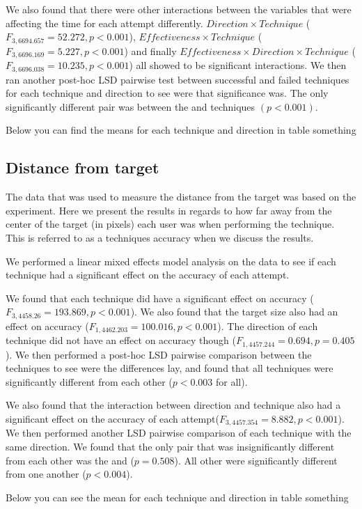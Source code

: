 We also found that there were other interactions between the variables that were affecting the time for each attempt differently. 
$Direction \times Technique$  ($F_{3,6694.657} = 52.272, p < 0.001$), $Effectiveness \times Technique$  ($F_{3,6696.169} = 5.227, p < 0.001$) and finally $Effectiveness \times Direction \times Technique$  ($F_{3,6696.038} = 10.235, p < 0.001$) all showed to be significant interactions. 
We then ran another post-hoc LSD pairwise test between successful and failed techniques for each technique and direction to see were that significance was. 
The only significantly different pair was between the \grab \push and \grab \pull techniques $(p < 0.001)$.

Below you can find the means for each technique and direction in table something

\subsection{Distance from target}
The data that was used to measure the distance from the target was based on the \accuracy experiment.
Here we present the results in regards to how far away from the center of the target (in pixels) each user was when performing the technique. 
This is referred to as a techniques accuracy when we discuss the results. 

We performed a linear mixed effects model analysis on the data to see if each technique had a significant effect on the accuracy of each attempt. 

We found that each technique did have a significant effect on accuracy ($F_{3,4458.26}=193.869, p<0.001$).
We also found that the target size also had an effect on accuracy ($F_{1,4462.203}=100.016, p<0.001$).
The direction of each technique did not have an effect on accuracy though ($F_{1,4457.244}=0.694, p=0.405$). 
We then performed a post-hoc LSD pairwise comparison between the techniques to see were the differences lay, and found that all techniques were significantly different from each other ($p<0.003$ for all).

We also found that the interaction between direction and technique also had a significant effect on the accuracy of each attempt($F_{3,4457.354}=8.882, p<0.001$). 
We then performed another LSD pairwise comparison of each technique with the same direction. 
We found that the only pair that was insignificantly different from each other was the \push \grab and \throw ($p=0.508$). 
All other were significantly different from one another ($p<0.004$). 

Below you can see the mean for each technique and direction in table something 



